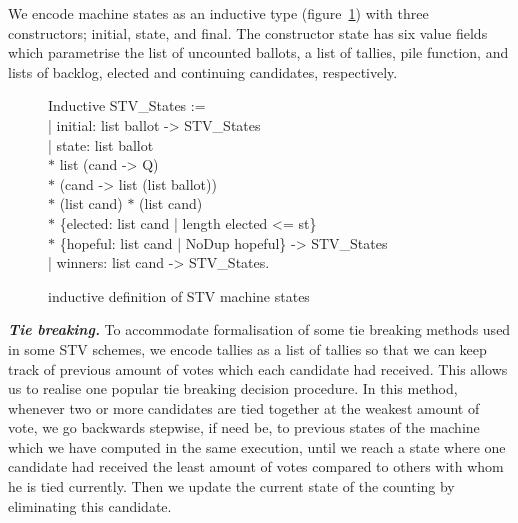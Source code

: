 \documentclass{llncs}
\begin{document}
We encode machine states as an inductive type (figure~\ref{fig;fig.1}) with three constructors; {\selectfont initial}, {\selectfont state}, and {\selectfont final}. The constructor {\selectfont state} has six value fields which parametrise the list of uncounted ballots, a list of tallies, pile function, and lists of backlog, elected and continuing candidates, respectively.\\
\begin{scriptsize}
\begin{figure}[t]
{\selectfont
Inductive STV\_States :=\\
   \hspace*{0.33cm} | initial:
     list ballot -> STV\_States \\
  \hspace*{0.5cm}| state:                                   
\hspace*{0.1cm}  list ballot     \\                   
     \hspace*{2.0cm}$*$ list (cand -> Q)     \\           
     \hspace*{2.0cm}$*$ (cand -> list (list ballot)) \\        
     \hspace*{2.0cm}$*$ (list cand) $*$ (list cand)               \\      
     \hspace*{2.0cm}$*$ \{elected: list cand | length  elected <= st\} \\  
     \hspace*{2.0cm}$*$ \{hopeful: list cand | NoDup hopeful\}         
     -> STV\_States\\
  \hspace*{0.5cm}| winners:                 
    list cand -> STV\_States.       
}
\caption{inductive definition of STV machine states}
\label{fig;fig.1}
\end{figure}
\end{scriptsize}
\textbf{\emph{Tie breaking.}} To accommodate formalisation of some tie breaking methods used in some STV schemes, we encode tallies as a list of tallies so that we can keep track of previous amount of votes which each candidate had received. This allows us to realise one popular tie breaking decision procedure. In this method, whenever two or more candidates are tied together at the weakest amount of vote, we go backwards stepwise, if need be, to previous states of the machine which we have computed in the same execution, until we reach a state where one candidate had received the least amount of votes compared to others with whom he is tied currently. Then we update the current state of the counting by eliminating this candidate.   
\end{document}
